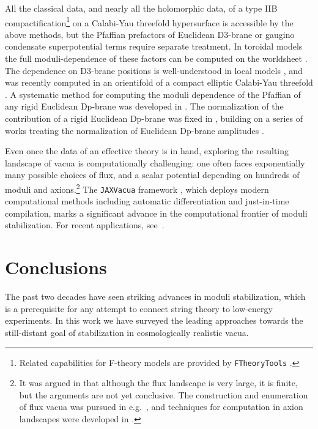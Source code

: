 \documentclass[12pt,a4wide]{article}
\begin{document}
All the classical data, and nearly all the holomorphic data, of a type IIB compactification\footnote{Related capabilities for F-theory models are provided by \texttt{FTheoryTools} \cite{FTheoryTools}.} on a Calabi-Yau threefold hypersurface is accessible by the above methods, but the Pfaffian prefactors of Euclidean D3-brane or gaugino condensate superpotential terms require separate treatment.  In toroidal models the full moduli-dependence of these factors can be computed on the worldsheet \cite{Berg:2004ek}.
The dependence on D3-brane positions is well-understood in local models \cite{Baumann:2006th}, and was recently computed in an orientifold of a compact elliptic Calabi-Yau threefold \cite{Kim:2022uni}.  A systematic method for computing the moduli dependence of the Pfaffian of any rigid Euclidean Dp-brane was developed in \cite{Kim:2023cbh}.  The 
normalization of the contribution of a rigid Euclidean Dp-brane was 
fixed in \cite{Alexandrov:2022mmy}, building on a series of works treating the normalization of Euclidean Dp-brane amplitudes \cite{Sen:2020cef,Sen:2021tpp,Alexandrov:2021dyl}.
 

Even once the data of an effective theory is in hand, 
exploring the resulting landscape of vacua is computationally challenging: one often faces exponentially many possible choices of flux, and a scalar potential depending on hundreds of moduli and axions.\footnote{It was argued in \cite{Acharya:2006zw, Grimm:2020cda, Bakker:2021uqw} that although the flux landscape is very large, it is finite, but the arguments are not yet conclusive.  The construction and enumeration of flux vacua was pursued in e.g.~\cite{Braun:2020jrx,Bena:2021wyr,Grimm:2021ckh,Tsagkaris:2022apo,Plauschinn:2023hjw}, and techniques for computation in axion landscapes were developed in \cite{Gendler:2023hwg}.}  The \texttt{JAXVacua} framework \cite{Dubey:2023dvu},
which deploys modern computational methods including automatic differentiation and just-in-time compilation, marks a significant advance in the computational frontier of moduli stabilization.  For recent applications, see~\cite{Krippendorf:2023idy,Ebelt:2023clh}.


\section{Conclusions}

The past two decades have seen striking advances in 
moduli stabilization, which
is a 
prerequisite for
any attempt 
to connect string theory to
low-energy experiments. 
In this work we have surveyed the leading approaches towards the still-distant goal 
of stabilization in 
cosmologically realistic vacua.
 
\end{document}
